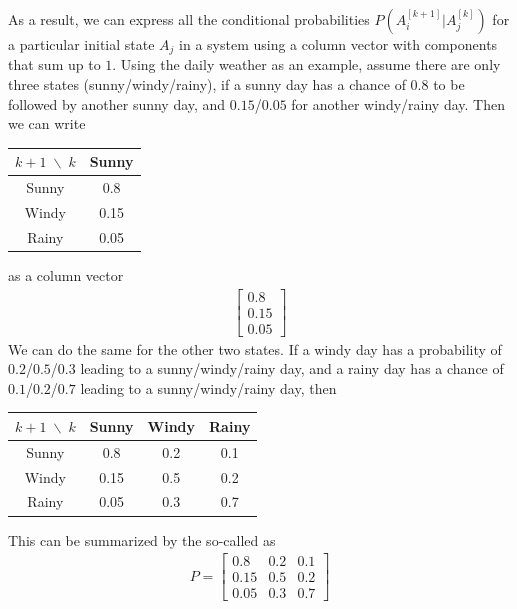 As a result, we can express all the conditional probabilities $P(A_i^{[k+1]}|A_j^{[k]})$ for a particular initial state $A_j$ in a system using a column vector with components that sum up to $1$. Using the daily weather as an example, assume there are only three states (sunny/windy/rainy), if a sunny day has a chance of $0.8$ to be followed by another sunny day, and $0.15$/$0.05$ for another windy/rainy day. Then we can write
\begin{center}
\begin{tabular}{|c|c|}
\hline
$k+1 \; \backslash \; k$ & Sunny \\
\hline
Sunny & 0.8 \\
\hline
Windy & 0.15 \\
\hline 
Rainy & 0.05 \\
\hline
\end{tabular}
\end{center}
as a column vector
\begin{align*}
\begin{bmatrix}
0.8 \\
0.15 \\
0.05
\end{bmatrix}
\end{align*}
We can do the same for the other two states. If a windy day has a probability of $0.2$/$0.5$/$0.3$ leading to a sunny/windy/rainy day, and a rainy day has a chance of $0.1$/$0.2$/$0.7$ leading to a sunny/windy/rainy day, then
\begin{center}
\begin{tabular}{|c|c|c|c|}
\hline
$k+1 \; \backslash \; k$ & Sunny & Windy & Rainy \\
\hline
Sunny & 0.8 & 0.2 & 0.1\\
\hline
Windy & 0.15 & 0.5 & 0.2 \\
\hline 
Rainy & 0.05 & 0.3 & 0.7 \\
\hline
\end{tabular}
\end{center}
This can be summarized by the so-called  as
\begin{align*}
P = 
\begin{bmatrix}
0.8 & 0.2 & 0.1\\
0.15 & 0.5 & 0.2 \\
0.05 & 0.3 & 0.7
\end{bmatrix}
\end{align*}
